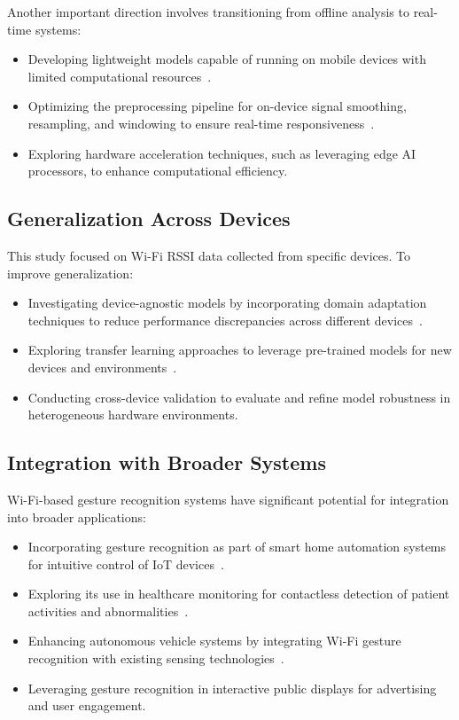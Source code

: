 \documentclass[10pt,twocolumn,letterpaper]{article}
\begin{document}
Another important direction involves transitioning from offline analysis to real-time systems:
\begin{itemize}
    \item Developing lightweight models capable of running on mobile devices with limited computational resources~\cite{abdelnasser2015wifi}.
    \item Optimizing the preprocessing pipeline for on-device signal smoothing, resampling, and windowing to ensure real-time responsiveness~\cite{haseeb2020wisture}.
    \item Exploring hardware acceleration techniques, such as leveraging edge AI processors, to enhance computational efficiency.
\end{itemize}

\subsection{Generalization Across Devices}

This study focused on Wi-Fi RSSI data collected from specific devices. To improve generalization:
\begin{itemize}
    \item Investigating device-agnostic models by incorporating domain adaptation techniques to reduce performance discrepancies across different devices~\cite{wang2017wifi}.
    \item Exploring transfer learning approaches to leverage pre-trained models for new devices and environments~\cite{pan2010survey}.
    \item Conducting cross-device validation to evaluate and refine model robustness in heterogeneous hardware environments.
\end{itemize}

\subsection{Integration with Broader Systems}

Wi-Fi-based gesture recognition systems have significant potential for integration into broader applications:
\begin{itemize}
    \item Incorporating gesture recognition as part of smart home automation systems for intuitive control of IoT devices~\cite{wang2017wifi}.
    \item Exploring its use in healthcare monitoring for contactless detection of patient activities and abnormalities~\cite{abdelnasser2015wifi}.
    \item Enhancing autonomous vehicle systems by integrating Wi-Fi gesture recognition with existing sensing technologies~\cite{wang2017wifi}.
    \item Leveraging gesture recognition in interactive public displays for advertising and user engagement.
\end{itemize}
\end{document}

